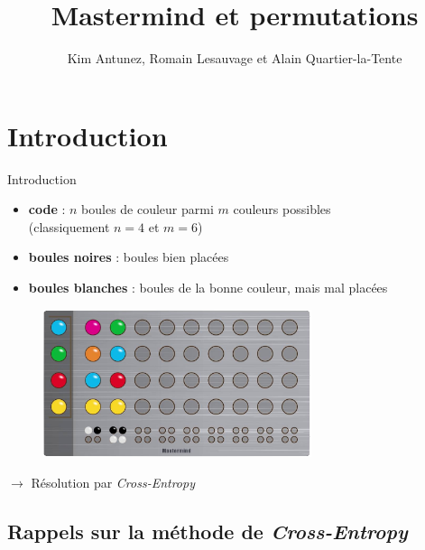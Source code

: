\documentclass[10pt,xcolor=table,color={dvipsnames,usenames},ignorenonframetext,usepdftitle=false,french]{beamer}
\title{Mastermind et permutations}
\author{Kim Antunez, Romain Lesauvage et Alain Quartier-la-Tente}
\date{}
\providecommand{\tightlist}{%
  \setlength{\parskip}{0pt}
  }
\begin{document}
\begin{frame}
\titlepage
\end{frame}

\hypertarget{introduction}{%
\section{Introduction}\label{introduction}}

\begin{frame}{Introduction}
\protect\hypertarget{introduction-1}{}

\begin{itemize}
\tightlist
\item
  \textbf{code} : \(n\) boules de couleur parmi \(m\) couleurs
  possibles\\
  (classiquement \(n = 4\) et \(m = 6\))\\
\item
  \textbf{boules noires} : boules bien placées
\item
  \textbf{boules blanches} : boules de la bonne couleur, mais mal
  placées
\end{itemize}

\begin{figure}

\includegraphics[width=0.7\textwidth]{img/mastermind.png}
\captionsetup{margin=0cm,format=hang,justification=justified}
\end{figure}

\(\longrightarrow\) Résolution par \emph{Cross-Entropy}

\end{frame}

\hypertarget{rappels-sur-la-muxe9thode-de-cross-entropy}{%
\subsection{\texorpdfstring{Rappels sur la méthode de
\emph{Cross-Entropy}}{Rappels sur la méthode de Cross-Entropy}}\label{rappels-sur-la-muxe9thode-de-cross-entropy}}
\end{document}
